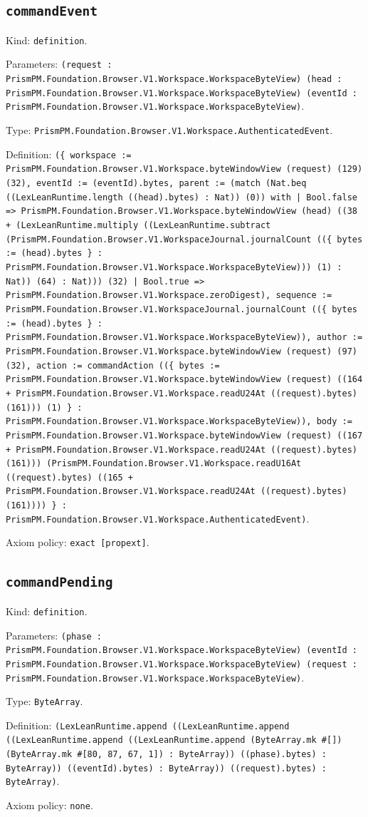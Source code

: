 \documentclass[11pt]{article}
\begin{document}
\subsection*{\texttt{commandEvent}}
\noindent Kind: \texttt{definition}.\par
\noindent Parameters: \texttt{(request : PrismPM.Foundation.Browser.V1.Workspace.WorkspaceByteView) (head : PrismPM.Foundation.Browser.V1.Workspace.WorkspaceByteView) (eventId : PrismPM.Foundation.Browser.V1.Workspace.WorkspaceByteView)}.\par
\noindent Type: \texttt{PrismPM.Foundation.Browser.V1.Workspace.AuthenticatedEvent}.\par
\noindent Definition: \texttt{(\{ workspace := PrismPM.Foundation.Browser.V1.Workspace.byteWindowView (request) (129) (32), eventId := (eventId).bytes, parent := (match (Nat.beq ((LexLeanRuntime.length ((head).bytes) : Nat)) (0)) with | Bool.false => PrismPM.Foundation.Browser.V1.Workspace.byteWindowView (head) ((38 + (LexLeanRuntime.multiply ((LexLeanRuntime.subtract (PrismPM.Foundation.Browser.V1.WorkspaceJournal.journalCount ((\{ bytes := (head).bytes \} : PrismPM.Foundation.Browser.V1.Workspace.WorkspaceByteView))) (1) : Nat)) (64) : Nat))) (32) | Bool.true => PrismPM.Foundation.Browser.V1.Workspace.zeroDigest), sequence := PrismPM.Foundation.Browser.V1.WorkspaceJournal.journalCount ((\{ bytes := (head).bytes \} : PrismPM.Foundation.Browser.V1.Workspace.WorkspaceByteView)), author := PrismPM.Foundation.Browser.V1.Workspace.byteWindowView (request) (97) (32), action := commandAction ((\{ bytes := PrismPM.Foundation.Browser.V1.Workspace.byteWindowView (request) ((164 + PrismPM.Foundation.Browser.V1.Workspace.readU24At ((request).bytes) (161))) (1) \} : PrismPM.Foundation.Browser.V1.Workspace.WorkspaceByteView)), body := PrismPM.Foundation.Browser.V1.Workspace.byteWindowView (request) ((167 + PrismPM.Foundation.Browser.V1.Workspace.readU24At ((request).bytes) (161))) (PrismPM.Foundation.Browser.V1.Workspace.readU16At ((request).bytes) ((165 + PrismPM.Foundation.Browser.V1.Workspace.readU24At ((request).bytes) (161)))) \} : PrismPM.Foundation.Browser.V1.Workspace.AuthenticatedEvent)}.\par
\noindent Axiom policy: \texttt{exact [propext]}.\par
\subsection*{\texttt{commandPending}}
\noindent Kind: \texttt{definition}.\par
\noindent Parameters: \texttt{(phase : PrismPM.Foundation.Browser.V1.Workspace.WorkspaceByteView) (eventId : PrismPM.Foundation.Browser.V1.Workspace.WorkspaceByteView) (request : PrismPM.Foundation.Browser.V1.Workspace.WorkspaceByteView)}.\par
\noindent Type: \texttt{ByteArray}.\par
\noindent Definition: \texttt{(LexLeanRuntime.append ((LexLeanRuntime.append ((LexLeanRuntime.append ((LexLeanRuntime.append (ByteArray.mk \#[]) (ByteArray.mk \#[80, 87, 67, 1]) : ByteArray)) ((phase).bytes) : ByteArray)) ((eventId).bytes) : ByteArray)) ((request).bytes) : ByteArray)}.\par
\noindent Axiom policy: \texttt{none}.\par
\end{document}
